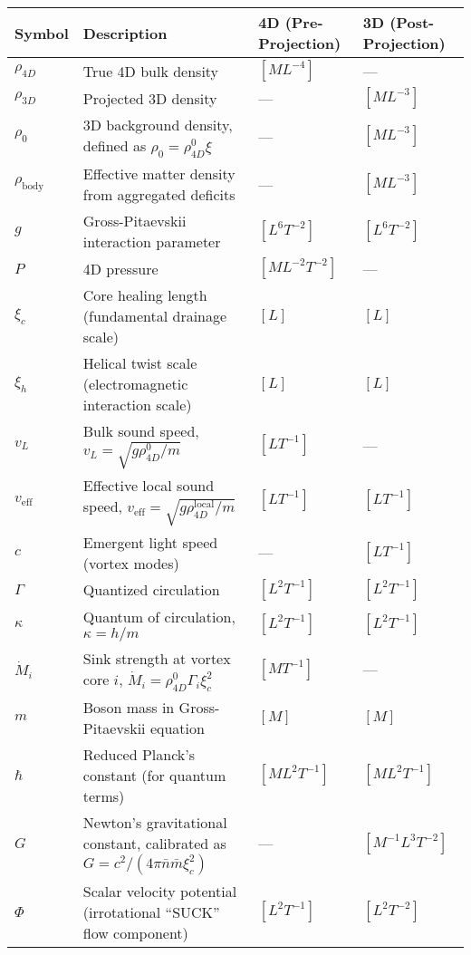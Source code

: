 \begin{table}[H]
\centering
\begin{tabularx}{\textwidth}{|l|Y|l|l|}
\hline
Symbol & Description & 4D (Pre-Projection) & 3D (Post-Projection) \\
\hline
$\rho_{4D}$ & True 4D bulk density & $[M L^{-4}]$ & --- \\
\hline
$\rho_{3D}$ & Projected 3D density & --- & $[M L^{-3}]$ \\
\hline
$\rho_0$ & 3D background density, defined as $\rho_0 = \rho_{4D}^0 \xi$ & --- & $[M L^{-3}]$ \\
\hline
$\rho_{\text{body}}$ & Effective matter density from aggregated deficits & --- & $[M L^{-3}]$ \\
\hline
$g$ & Gross-Pitaevskii interaction parameter & $[L^6 T^{-2}]$ & $[L^6 T^{-2}]$ \\
\hline
$P$ & 4D pressure & $[M L^{-2} T^{-2}]$ & --- \\
\hline
$\xi_c$ & Core healing length (fundamental drainage scale) & $[L]$ & $[L]$ \\
\hline
$\xi_h$ & Helical twist scale (electromagnetic interaction scale) & $[L]$ & $[L]$ \\
\hline
$v_L$ & Bulk sound speed, $v_L = \sqrt{g \rho_{4D}^0 / m}$ & $[L T^{-1}]$ & --- \\
\hline
$v_{\text{eff}}$ & Effective local sound speed, $v_{\text{eff}} = \sqrt{g \rho_{4D}^{\text{local}} / m}$ & $[L T^{-1}]$ & $[L T^{-1}]$ \\
\hline
$c$ & Emergent light speed (vortex modes) & --- & $[L T^{-1}]$ \\
\hline
$\Gamma$ & Quantized circulation & $[L^2 T^{-1}]$ & $[L^2 T^{-1}]$ \\
\hline
$\kappa$ & Quantum of circulation, $\kappa = h / m$ & $[L^2 T^{-1}]$ & $[L^2 T^{-1}]$ \\
\hline
$\dot{M}_i$ & Sink strength at vortex core $i$, $\dot{M}_i = \rho_{4D}^0 \Gamma_i \xi_c^2$ & $[M T^{-1}]$ & --- \\
\hline
$m$ & Boson mass in Gross-Pitaevskii equation & $[M]$ & $[M]$ \\
\hline
$\hbar$ & Reduced Planck's constant (for quantum terms) & $[M L^2 T^{-1}]$ & $[M L^2 T^{-1}]$ \\
\hline
$G$ & Newton's gravitational constant, calibrated as $G = c^2 / (4\pi \bar{n} \bar{m} \xi_c^2)$ & --- & $[M^{-1} L^3 T^{-2}]$ \\
\hline
$\Phi$ & Scalar velocity potential (irrotational ``SUCK'' flow component) & $[L^2 T^{-1}]$ & $[L^2 T^{-2}]$ \\

\end{tabularx}
\end{table}
